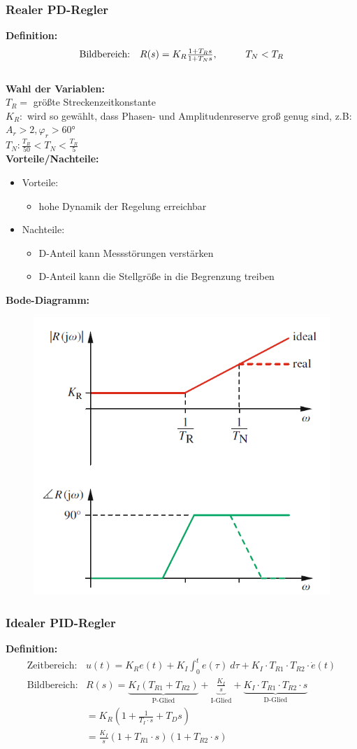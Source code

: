 \documentclass[10pt,a4paper]{article}
\newcommand{\tab}[1][1]{\hspace*{#1cm}}
\begin{document}
\subsubsection{Realer PD-Regler}
\textbf{Definition:}
$$
	\begin{array}{ll}
	\text{Bildbereich:} & R(s) = K_R \frac{1 + T_R s}{1 + T_N s}, \tab T_N < T_R
	\end{array}
$$ \\

\textbf{Wahl der Variablen:} \\
$T_R=$ größte Streckenzeitkonstante  \\
$K_R:$ wird so gewählt, dass Phasen- und Amplitudenreserve groß genug sind, z.B: $A_r > 2, \varphi_r > 60°$ \\
$T_N: \frac{T_R}{50} < T_N < \frac{T_R}{5}$ \\

\textbf{Vorteile/Nachteile:}
\begin{itemize}
	\item Vorteile:
	\begin{itemize}
		\item hohe Dynamik der Regelung erreichbar
	\end{itemize}
	\item Nachteile:
	\begin{itemize}
		\item D-Anteil kann Messstörungen verstärken
		\item D-Anteil kann die Stellgröße in die Begrenzung treiben
	\end{itemize}
\end{itemize}

\textbf{Bode-Diagramm:}
\begin{figure}[H]
	\includegraphics[width = 0.4\columnwidth]{imgs/pd-regler.png}
\end{figure}

\subsubsection{Idealer PID-Regler}
\textbf{Definition:}
$$
	\begin{array}{ll}
	\text{Zeitbereich:} & u(t) = K_R e(t) + K_I \int_0^t e(\tau) ~d\tau + K_I ⋅ T_{R1} ⋅ T_{R2} ⋅ \dot e(t)\\
	\text{Bildbereich:} & R(s) = \underbrace{K_I(T_{R1} + T_{R2})}_{\text{P-Glied}} + \underbrace{\frac{K_I}{s}}_{\text{I-Glied}} + \underbrace{K_I ⋅ T_{R1} ⋅ T_{R2} ⋅ s}_{\text{D-Glied}} \\
	& = K_R(1 + \frac{1}{T_I ⋅ s} + T_D s) \\
	& = \frac{K_I}{s}(1 + T_{R1} ⋅ s)(1 + T_{R2} ⋅ s)
	\end{array}
$$ \\
\end{document}
